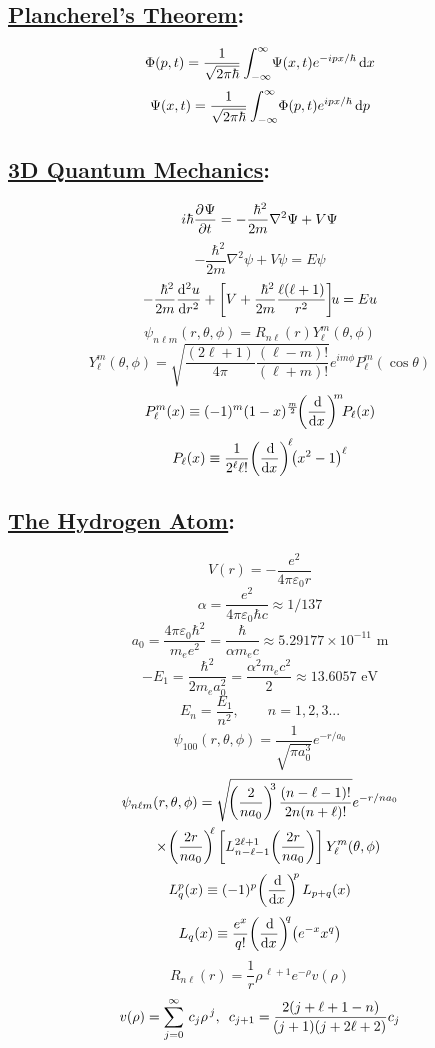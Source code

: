 \documentclass[fleqn]{article}
\begin{document}
\begin{multicols*}{3}
\subsection*{ \centering \underline{Plancherel's Theorem}:}
\[\Phi(p,t) = \frac{1}{\sqrt{2\pi\hbar}}\int_{-\infty}^{\infty} \! \Psi(x,t)e^{-ipx/\hbar} \, \mathrm{d} x\]
\[\Psi(x,t) = \frac{1}{\sqrt{2\pi\hbar}}\int_{-\infty}^{\infty} \! \Phi(p,t)e^{ipx/\hbar} \, \mathrm{d} p\]

\columnbreak
\subsection*{ \centering \underline{3D Quantum Mechanics}:}
\[i\hbar\frac{\partial^{}\!{\,\Psi}}{\partial{t}^{} }=-\frac{\,\,\hbar^2}{2m}\nabla^2\Psi + V\Psi\]
\[-\frac{\,\,\hbar^2}{2m}\nabla^2\psi + V\psi = E\psi\]
\[-\frac{\,\,\hbar^2}{2m}\frac{\mathrm{d}^{2}\!{\,u}}{\mathrm{d}{r}^{2} } + \left[ V + \frac{\,\,\hbar^2}{2m}\frac{\ell(\ell+1)}{r^2}\right]\!\!u = Eu\]
\[\psi_{n\ell m}(r,\theta,\phi) = R_{n\ell}(r)Y^{m}_{\ell}(\theta,\phi)\]
\[Y_{\ell}^{m}(\theta,\phi) = \sqrt{\frac{(2\ell + 1)}{4\pi}\frac{(\ell - m)!}{(\ell + m)!}}e^{im\phi}P^{m}_{\ell}\!(\cos\theta)\]
\[P^{m}_{\ell}(x) \equiv (-1)^{m}(1-x)^{\frac{m}{2}}\!\!\left({\frac{\mathrm{d}^{}\!{}}{\mathrm{d}{x}^{} }}\right)^{\!\!m}\!\!P_{\ell}(x)\]
\[P_{\ell}(x)\equiv\frac{1}{2^\ell \ell!}\!\left({\frac{\mathrm{d}^{}\!{}}{\mathrm{d}{x}^{} }}\right)^{\!\ell}\!\!\left({x^2-1}\right)^\ell\]

\subsection*{ \centering \underline{The Hydrogen Atom}:}
\[V(r) = -\frac{e^2}{4\pi\varepsilon_0r}\]
\[\alpha = \frac{e^2}{4\pi\varepsilon_0\hbar c} \approx 1/137\]
\[a_0 = \frac{4\pi\varepsilon_0\hbar^2}{m_{e}e^2} = \frac{\hbar}{\alpha m_{e}c}\approx 5.29177 \times 10^{-11}\mbox{ m}\]
\[-E_1 = \frac{\hbar^2}{2m_{e}a_{0}^2} = \frac{\alpha^2m_{e}c^2}{2} \approx 13.6057 \mbox{ eV}\]
\[E_n=\frac{E_1}{n^2},\qquad n=1,2,3...\]
\[\psi_{100}(r,\theta,\phi) = \frac{1}{\sqrt{\pi a_{0}^3}}e^{-r/a_{0}}\]\begin{align}
\psi_{n\ell m}&(r,\theta,\phi) = \sqrt{\!\left({\frac{2}{na_{0}}}\right)^{\!\!3}\frac{(n-\ell-1)!}{2n(n+\ell)!}}e^{-r/na_{0}} \nonumber\\
&\times\!\left({\frac{2r}{na_{0}}}\right)^{\!\!\ell}\left[L^{2\ell+1}_{n-\ell-1}\!\left({\frac{2r}{na_{0}}}\right)\right]Y^{m}_{\ell}(\theta,\phi) \nonumber
\end{align}
\[L^{p}_{q}(x) \equiv (-1)^{p}\!\left({\frac{\mathrm{d}^{}\!{}}{\mathrm{d}{x}^{} }}\right)^{\!\!p}L_{p+q}(x) \]
\[L_{q}(x)\equiv \frac{e^x}{q!}\!\left({\frac{\mathrm{d}^{}\!{}}{\mathrm{d}{x}^{} }}\right)^{\!\!q}\!\left({e^{-x}x^q}\right)\]
\[R_{n\ell}(r) = \frac{1}{r}\rho^{\,\ell+1}e^{-\rho}v(\rho)\]
\[v(\rho) = \sum_{j=0}^{\infty} \, c_{j}\rho^{\,j},\,\,\, c_{j+1} = \frac{2\!\left({j+\ell+1-n}\right)}{\!\left({j+1}\right)\!\left({j+2\ell+2}\right)}c_{j}\]













\end{multicols*}
\end{document}
